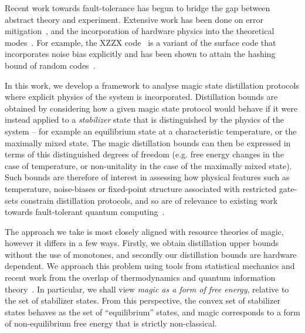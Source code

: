 \documentclass[pra,
aps,
twocolumn,
superscriptaddress,
groupedaddress,
nofootinbib,
reprint
]{revtex4-1}
\begin{document}
  
Recent work towards fault-tolerance has begun to bridge the gap between abstract theory and experiment. Extensive work has been done on error mitigation~\cite{Li_2017, Temme_2017, Endo_2018, McClean_2017}, and the incorporation of hardware physics into the theoretical modes~\cite{Kandala_2019, Colless_2018, song2018quantum, Bravyi_2021}. For example, the XZZX code~\cite{bonilla_ataides_xzzx_2021} is a variant of the surface code that incorporates noise bias explicitly and has been shown to attain the hashing bound of random codes~\cite{Bennett_1996}. 

In this work, we develop a framework to analyse magic state distillation protocols where explicit physics of the system is incorporated.  Distillation bounds are obtained by considering how a given magic state protocol would behave if it were instead applied to a \emph{stabilizer} state that is distinguished by the physics of the system -- for example an equilibrium state at a characteristic temperature, or the maximally mixed state. The magic distillation bounds can then be expressed in terms of this distinguished degrees of freedom (e.g. free energy changes in the case of temperature, or non-unitality in the case of the maximally mixed state). Such bounds are therefore of interest in assessing how physical features such as temperature, noise-biases or fixed-point structure associated with restricted gate-sets constrain distillation protocols, and so are of relevance to existing work towards fault-tolerant quantum computing~\cite{Aliferis_2008, Stephens_2013, Li_2015, Babbush_2018, Tuckett_2019, Guillaud_2019, Fowler_2019}. 

The approach we take is most closely aligned with resource theories of magic, however it differs in a few ways. Firstly, we obtain distillation upper bounds without the use of monotones, and secondly our distillation bounds are hardware dependent. We approach this problem using tools from statistical mechanics and recent work from the overlap of thermodynamics and quantum information theory~\cite{cit:janzing, cit:horodecki2, Brandao_2015, Vinjanampathy_2016, Goold_2016, cit:lostaglio, cit:gour}. In particular, we shall view \emph{magic as a form of free energy}, relative to the set of stabilizer states. From this perspective, the convex set of stabilizer states behaves as the set of ``equilibrium'' states, and magic corresponds to a form of non-equilibrium free energy that is strictly non-classical.
\end{document}
